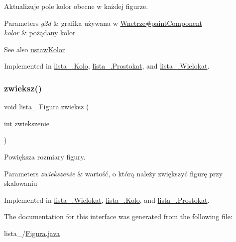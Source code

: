 Aktualizuje pole kolor obecne w każdej figurze. 
\begin{DoxyParams}{Parameters}
{\em g2d} & grafika używana w \mbox{\hyperlink{classlista__5_1_1_wnetrze_aa8676192e150a17230d72de122744a47}{Wnetrze\#paint\+Component}} \\
\hline
{\em kolor} & pożądany kolor \\
\hline
\end{DoxyParams}
\begin{DoxySeeAlso}{See also}
\mbox{\hyperlink{interfacelista__5_1_1_figura_a3cc13bf7229b288d743be7903b3b61a4}{ustaw\+Kolor}} 
\end{DoxySeeAlso}


Implemented in \mbox{\hyperlink{classlista__5_1_1_kolo_af4a5e91767dcc103808fb63f39b7404a}{lista\+\_.\+Kolo}}, \mbox{\hyperlink{classlista__5_1_1_prostokat_aa776fbd55cc88f2bb8b8a202109e77ce}{lista\+\_.\+Prostokat}}, and \mbox{\hyperlink{classlista__5_1_1_wielokat_ae863735ff7b742c4703bc142455d34ce}{lista\+\_.\+Wielokat}}.

\mbox{\label{interfacelista__5_1_1_figura_a6813d7ac31e5118bcb34b9b29868ce5f}} 
\subsubsection{\texorpdfstring{zwieksz()}{zwieksz()}}
{\footnotesize\ttfamily void lista\+\_.\+Figura.\+zwieksz (\begin{DoxyParamCaption}\item[{int}]{zwiekszenie }\end{DoxyParamCaption})}

Powiększa rozmiary figury. 
\begin{DoxyParams}{Parameters}
{\em zwiekszenie} & wartość, o którą należy zwiększyć figurę przy skalowaniu \\
\hline
\end{DoxyParams}


Implemented in \mbox{\hyperlink{classlista__5_1_1_wielokat_a17cfc98331e2a135886070a4094ac0e6}{lista\+\_.\+Wielokat}}, \mbox{\hyperlink{classlista__5_1_1_kolo_a045124cf2c42238baba9ba097c2f5af2}{lista\+\_.\+Kolo}}, and \mbox{\hyperlink{classlista__5_1_1_prostokat_acc961816d5fba86f3442ca34059492f5}{lista\+\_.\+Prostokat}}.



The documentation for this interface was generated from the following file\+:\begin{DoxyCompactItemize}
\item 
lista\+\_/\mbox{\hyperlink{_figura_8java}{Figura.\+java}}\end{DoxyCompactItemize}
